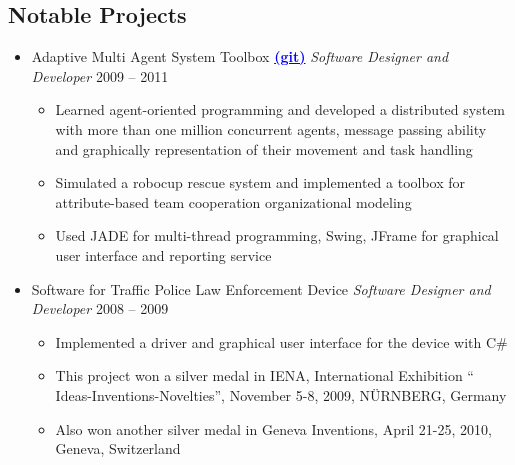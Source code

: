 \documentclass[letter]{res}
\begin{document}
\begin{resume}
		
		\section{Notable Projects}
		\begin{itemize}[leftmargin=-.1in]
			\item Adaptive Multi Agent System Toolbox {\href{https://github.com/omid55/team_based_rescue_jade_multi_agent_system}{\textbf{\textcolor{blue}{(git)}}}} \newline
			{\sl Software Designer and Developer} \hfill 2009 – 2011\\
			\vspace{-4mm}
			\iflong
			\begin{itemize}
				\item Learned agent-oriented programming and developed a distributed system with more than one million concurrent agents, message passing ability and graphically representation of their movement and task handling
				\item Simulated a robocup rescue system and implemented a toolbox for 				attribute-based team cooperation organizational modeling
				\item Used JADE for multi-thread programming, Swing, JFrame for graphical user interface and reporting service
			\end{itemize}
			\fi
			
			\item Software for Traffic Police Law Enforcement Device \newline
			{\sl Software Designer and Developer} \hfill 2008 – 2009\\
			\vspace{-4mm}
			\iflong
			\begin{itemize}
				\item Implemented a driver and graphical user interface for the device with C\#
				\item This project won a silver medal in IENA, International Exhibition `` Ideas-Inventions-Novelties'', November 5-8, 2009, N\"{U}RNBERG, Germany
				\item Also won another silver medal in Geneva Inventions, April 21-25, 2010, Geneva, Switzerland
			\end{itemize}
			\fi
			

\end{itemize}
\end{resume}
\end{document}
